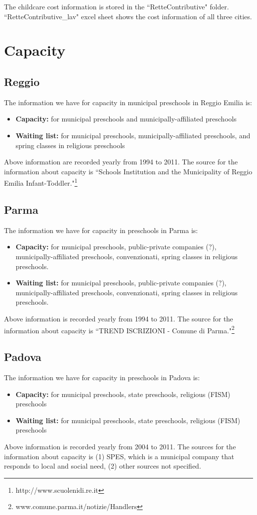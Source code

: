The childcare cost information is stored in the ``RetteContributive" folder. ``RetteContributive\_lav" excel sheet shows the cost information of all three cities. 

\section{Capacity}

\subsection{Reggio}

The information we have for capacity in municipal preschools in Reggio Emilia is:
\begin{itemize}
\item \textbf{Capacity:} for municipal preschools and municipally-affiliated preschools
\item \textbf{Waiting list:} for municipal preschools, municipally-affiliated preschools, and spring classes in religious preschools
\end{itemize}

Above information are recorded yearly from 1994 to 2011. The source for the information about capacity is ``Schools Institution and the Municipality of Reggio Emilia Infant-Toddler."\footnote{http://www.scuolenidi.re.it}

\subsection{Parma}

The information we have for capacity in preschools in Parma is:
\begin{itemize}
\item \textbf{Capacity:} for municipal preschools, public-private companies (?), municipally-affiliated preschools, convenzionati, spring classes in religious preschools.
\item \textbf{Waiting list:} for municipal preschools, public-private companies (?), municipally-affiliated preschools, convenzionati, spring classes in religious preschools.
\end{itemize}

Above information is recorded yearly from 1994 to 2011. The source for the information about capacity is ``TREND ISCRIZIONI - Comune di Parma."\footnote{www.comune.parma.it/notizie/Handlers}

\subsection{Padova}
The information we have for capacity in preschools in Padova is:
\begin{itemize}
\item \textbf{Capacity:} for municipal preschools, state preschools, religious (FISM) preschools
\item \textbf{Waiting list:} for municipal preschools, state preschools, religious (FISM) preschools
\end{itemize}

Above information is recorded yearly from 2004 to 2011. The sources for the information about capacity is (1) SPES, which is a municipal company that responds to local and social need, (2) other sources not specified.


